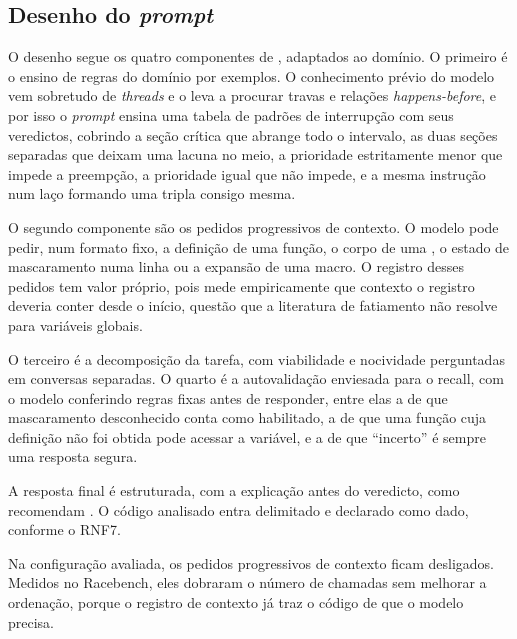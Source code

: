\subsection{Desenho do \textit{prompt}}

O desenho segue os quatro componentes de , adaptados ao
domínio. O primeiro é o ensino de regras do domínio por exemplos. O
conhecimento prévio do modelo vem sobretudo de \textit{threads} e o leva a
procurar travas e relações \textit{happens-before}, e por isso o \textit{prompt}
ensina uma tabela de padrões de interrupção com seus veredictos, cobrindo a
seção crítica que abrange todo o intervalo, as duas seções separadas que deixam
uma lacuna no meio, a prioridade estritamente menor que impede a preempção, a
prioridade igual que não impede, e a mesma instrução num laço formando uma
tripla consigo mesma.

O segundo componente são os pedidos progressivos de contexto. O modelo pode
pedir, num formato fixo, a definição de uma função, o corpo de uma \isr, o
estado de mascaramento numa linha ou a expansão de uma macro. O registro desses
pedidos tem valor próprio, pois mede empiricamente que contexto o registro
deveria conter desde o início, questão que a literatura de fatiamento não
resolve para variáveis globais.

O terceiro é a decomposição da tarefa, com viabilidade e nocividade perguntadas
em conversas separadas. O quarto é a autovalidação enviesada para o recall,
com o modelo conferindo regras fixas antes de responder, entre elas a de que
mascaramento desconhecido conta como habilitado, a de que uma função cuja
definição não foi obtida pode acessar a variável, e a de que ``incerto'' é
sempre uma resposta segura.

A resposta final é estruturada, com a explicação antes do veredicto, como
recomendam . O código analisado entra delimitado e declarado
como dado, conforme o RNF7.

Na configuração avaliada, os pedidos progressivos de contexto ficam
desligados. Medidos no Racebench, eles dobraram o número de chamadas sem
melhorar a ordenação, porque o registro de contexto já traz o código de que o
modelo precisa.

